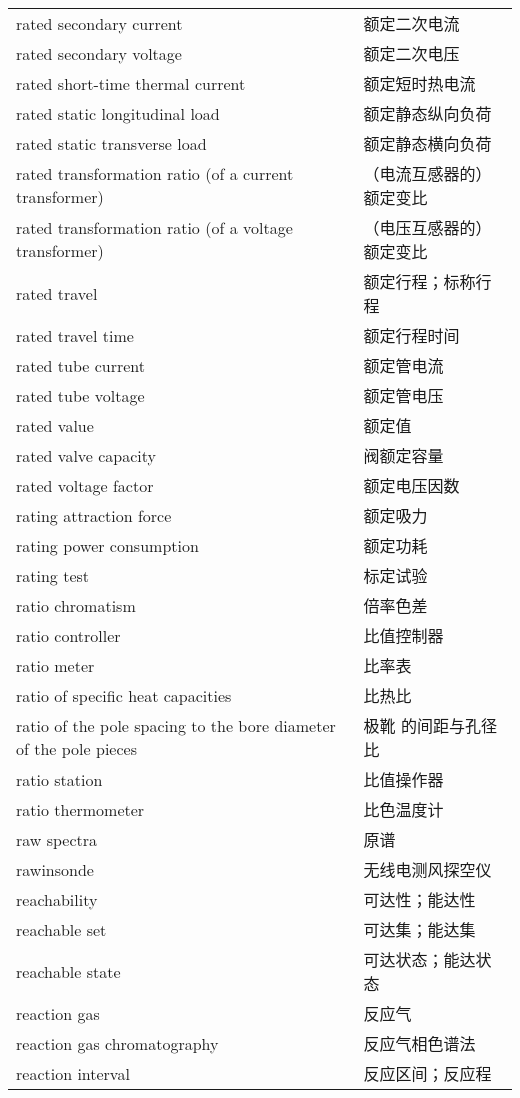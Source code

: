 \documentclass[
]{article}
\begin{document}
\begin{longtable}[]{@{}ll@{}}
rated secondary current & 额定二次电流 \\
rated secondary voltage & 额定二次电压 \\
rated short-time thermal current & 额定短时热电流 \\
rated static longitudinal load & 额定静态纵向负荷 \\
rated static transverse load & 额定静态横向负荷 \\
rated transformation ratio (of a current transformer) & （电流互感器的）
额定变比 \\
rated transformation ratio (of a voltage transformer) & （电压互感器的）
额定变比 \\
rated travel & 额定行程；标称行程 \\
rated travel time & 额定行程时间 \\
rated tube current & 额定管电流 \\
rated tube voltage & 额定管电压 \\
rated value & 额定值 \\
rated valve capacity & 阀额定容量 \\
rated voltage factor & 额定电压因数 \\
rating attraction force & 额定吸力 \\
rating power consumption & 额定功耗 \\
rating test & 标定试验 \\
ratio chromatism & 倍率色差 \\
ratio controller & 比值控制器 \\
ratio meter & 比率表 \\
ratio of specific heat capacities & 比热比 \\
ratio of the pole spacing to the bore diameter of the pole pieces & 极靴
的间距与孔径比 \\
ratio station & 比值操作器 \\
ratio thermometer & 比色温度计 \\
raw spectra & 原谱 \\
rawinsonde & 无线电测风探空仪 \\
reachability & 可达性；能达性 \\
reachable set & 可达集；能达集 \\
reachable state & 可达状态；能达状态 \\
reaction gas & 反应气 \\
reaction gas chromatography & 反应气相色谱法 \\
reaction interval & 反应区间；反应程 \\

\end{longtable}
\end{document}
